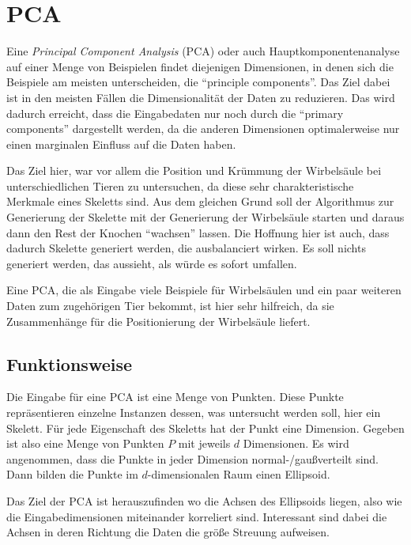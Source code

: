\chapter{PCA}

 Eine \emph{Principal Component Analysis} (PCA) oder auch Hauptkomponentenanalyse auf einer Menge von Beispielen findet diejenigen Dimensionen, in denen sich die Beispiele am meisten unterscheiden, die "`principle components"'. Das Ziel dabei ist in den meisten Fällen die Dimensionalität der Daten zu reduzieren. Das wird dadurch erreicht, dass die Eingabedaten nur noch durch die "`primary components"' dargestellt werden, da die anderen Dimensionen optimalerweise nur einen marginalen Einfluss auf die Daten haben.
 
 Das Ziel hier, war vor allem die Position und Krümmung der Wirbelsäule bei unterschiedlichen Tieren zu untersuchen, da diese sehr charakteristische Merkmale eines Skeletts sind. Aus dem gleichen Grund soll der Algorithmus zur Generierung der Skelette mit der Generierung der Wirbelsäule starten und daraus dann den Rest der Knochen "`wachsen"' lassen.
 Die Hoffnung hier ist auch, dass dadurch Skelette generiert werden, die ausbalanciert wirken. Es soll nichts generiert werden, das aussieht, als würde es sofort umfallen. 
 
 Eine PCA, die als Eingabe viele Beispiele für Wirbelsäulen und ein paar weiteren Daten zum zugehörigen Tier bekommt, ist hier sehr hilfreich, da sie Zusammenhänge für die Positionierung der Wirbelsäule liefert.
 
 
 \section{Funktionsweise}
 
 
 Die Eingabe für eine PCA ist eine Menge von Punkten. Diese Punkte repräsentieren einzelne Instanzen dessen, was untersucht werden soll, hier ein Skelett. Für jede Eigenschaft des Skeletts hat der Punkt eine Dimension. Gegeben ist also eine Menge von Punkten $P$ mit jeweils $d$ Dimensionen. Es wird angenommen, dass die Punkte in jeder Dimension normal-/gaußverteilt sind. Dann bilden die Punkte im $d$-dimensionalen Raum einen Ellipsoid.
 
 Das Ziel der PCA ist herauszufinden wo die Achsen des Ellipsoids liegen, also wie die Eingabedimensionen miteinander korreliert sind. Interessant sind dabei die Achsen in deren Richtung die Daten die größe Streuung aufweisen.
 
